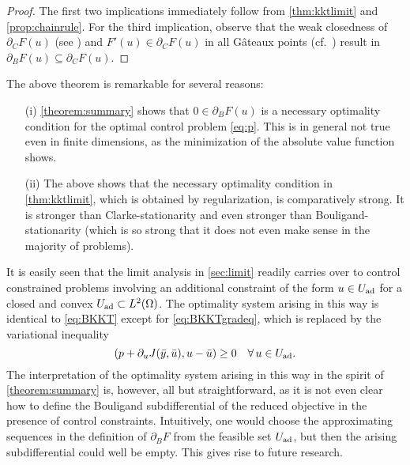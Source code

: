 \documentclass[reqno]{shinyart}
\begin{document}
\begin{proof}
    The first two implications immediately follow from \cref{thm:kktlimit} and 
    \cref{prop:chainrule}. For the third implication, observe that  
    the weak closedness of $\partial_C F(u)$ (see \cite[Prop.~2.1.5b]{Clarke:1990}) and $F'(u) \in \partial_C F(u)$ 
    in all G\^ateaux points (cf.\ \cite[Prop.~2.2.2]{Clarke:1990}) result in 
    $\partial_B F(u) \subseteq \partial_C F(u)$. 
\end{proof}

\begin{remark}
    The above theorem is remarkable for several reasons:
    \begin{itemize}
        \item[(i)] \cref{theorem:summary} shows that  $0 \in \partial_B F(u)$ 
            is a necessary optimality condition for the optimal control problem \eqref{eq:p}. 
            This is in general not true even in finite dimensions, as the minimization 
            of the absolute value function shows.
        \item[(ii)] The above shows that the necessary optimality condition in 
            \cref{thm:kktlimit}, which is obtained by regularization, is comparatively strong. 
            It is stronger than Clarke-stationarity and even stronger than Bouligand-stationarity
            (which is so strong that it does not even make sense in the majority of problems).
    \end{itemize}
\end{remark}

\begin{remark}\label{rem:controlconstr}
    It is easily seen that the limit analysis in \cref{sec:limit} readily carries 
    over to control constrained problems involving an additional constraint of the form  
    $u\in U_{\textup{ad}}$ for a closed and convex $U_{\textup{ad}}\subset L^2(\Omega)$. 
    The optimality system arising in this way is identical to \eqref{eq:BKKT} except 
    for \eqref{eq:BKKTgradeq}, which is replaced by the variational inequality
    \begin{equation*}
        (p + \partial_u J(\bar{y}, \bar{u}), u - \bar{u}) \geq 0 
        \quad \forall\,u \in U_{\textup{ad}}.
    \end{equation*}
    The interpretation of the optimality system arising in this way in the spirit 
    of \cref{theorem:summary} is, however, all but straightforward, as 
    it is not even clear how to define the Bouligand subdifferential of the reduced objective 
    in the presence of control constraints. Intuitively, one would choose the 
    approximating sequences in the definition of $\partial_B F$ from the feasible set
    $U_{\textup{ad}}$, but then the arising subdifferential could well be empty. 
    This gives rise to future research.
\end{remark}
\end{document}

